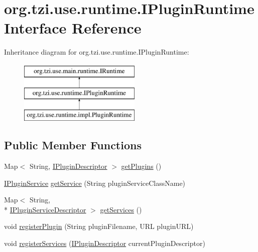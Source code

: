 \hypertarget{interfaceorg_1_1tzi_1_1use_1_1runtime_1_1_i_plugin_runtime}{\section{org.\-tzi.\-use.\-runtime.\-I\-Plugin\-Runtime Interface Reference}
\label{interfaceorg_1_1tzi_1_1use_1_1runtime_1_1_i_plugin_runtime}
}
Inheritance diagram for org.\-tzi.\-use.\-runtime.\-I\-Plugin\-Runtime\-:\begin{figure}[H]
\begin{center}
\leavevmode
\includegraphics[height=3.000000cm]{interfaceorg_1_1tzi_1_1use_1_1runtime_1_1_i_plugin_runtime}
\end{center}
\end{figure}
\subsection*{Public Member Functions}
\begin{DoxyCompactItemize}
\item 
Map$<$ String, \hyperlink{interfaceorg_1_1tzi_1_1use_1_1runtime_1_1_i_plugin_descriptor}{I\-Plugin\-Descriptor} $>$ \hyperlink{interfaceorg_1_1tzi_1_1use_1_1runtime_1_1_i_plugin_runtime_a8a62115e23838e5749982d76c07ea085}{get\-Plugins} ()
\item 
\hyperlink{interfaceorg_1_1tzi_1_1use_1_1runtime_1_1service_1_1_i_plugin_service}{I\-Plugin\-Service} \hyperlink{interfaceorg_1_1tzi_1_1use_1_1runtime_1_1_i_plugin_runtime_a6c2ad685aacafd26b8c15cc931cbe68c}{get\-Service} (String plugin\-Service\-Class\-Name)
\item 
Map$<$ String, \\*
\hyperlink{interfaceorg_1_1tzi_1_1use_1_1runtime_1_1service_1_1_i_plugin_service_descriptor}{I\-Plugin\-Service\-Descriptor} $>$ \hyperlink{interfaceorg_1_1tzi_1_1use_1_1runtime_1_1_i_plugin_runtime_a4706489f7f6b6c7d022e626a112ea1e0}{get\-Services} ()
\item 
void \hyperlink{interfaceorg_1_1tzi_1_1use_1_1runtime_1_1_i_plugin_runtime_ae20e0a52b98316f9622a0eb78aca04e6}{register\-Plugin} (String plugin\-Filename, U\-R\-L plugin\-U\-R\-L)
\item 
void \hyperlink{interfaceorg_1_1tzi_1_1use_1_1runtime_1_1_i_plugin_runtime_a26ff264d31b1b14e9810ce22608b9463}{register\-Services} (\hyperlink{interfaceorg_1_1tzi_1_1use_1_1runtime_1_1_i_plugin_descriptor}{I\-Plugin\-Descriptor} current\-Plugin\-Descriptor)
\end{DoxyCompactItemize}


